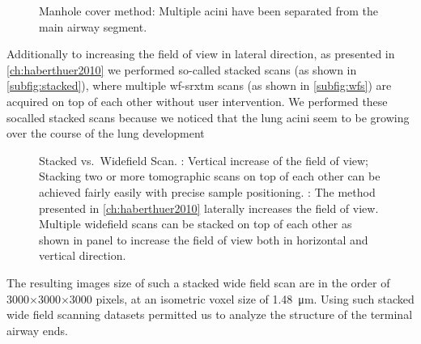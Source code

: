 \begin{figure}[htb]
{%
		}%
	\caption[Manhole cover method]{Manhole cover method: Multiple acini have been separated from the main airway segment.}
	\label{fig:3d-10a}
\end{figure}

Additionally to increasing the field of view in lateral direction, as presented in \autoref{ch:haberthuer2010} we performed so-called stacked scans (as shown in \autoref{subfig:stacked}), where multiple \ac{wf-srxtm} scans (as shown in \autoref{subfig:wfs}) are acquired on top of each other without user intervention. We performed these socalled stacked scans because we noticed that the lung acini seem to be growing over the course of the lung development

\def\scale{0.618}
\begin{figure}	[htb]
	\noindent{}%
	\caption[Stacked vs.\ Widefield Scan]{Stacked vs.\ Widefield Scan. : Vertical increase of the field of view; Stacking two or more tomographic scans on top of each other can be achieved fairly easily with precise sample positioning. : The method presented in \autoref{ch:haberthuer2010} laterally increases the field of view. Multiple widefield scans can be stacked on top of each other as shown in panel  to increase the field of view both in horizontal and vertical direction.}%
	\label{fig:stack}%
\end{figure}

The resulting images size of such a stacked wide field scan are in the order of 3000$\times$3000$\times$3000 pixels, at an isometric voxel size of \SI{1.48}{\micro\meter}. Using such stacked wide field scanning datasets permitted us to analyze the structure of the terminal airway ends.

